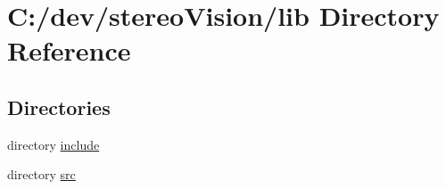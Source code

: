\section{C\+:/dev/stereo\+Vision/lib Directory Reference}
\label{dir_97aefd0d527b934f1d99a682da8fe6a9}
\subsection*{Directories}
\begin{DoxyCompactItemize}
\item 
directory \hyperlink{dir_5a30104352ef4255dc24354b02eb2d20}{include}
\item 
directory \hyperlink{dir_a065c5f60305fee3569f887679366939}{src}
\end{DoxyCompactItemize}

